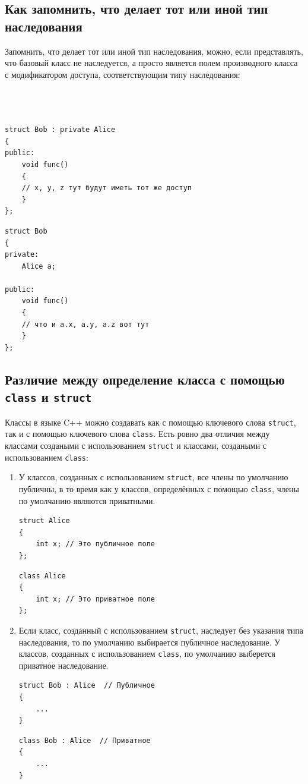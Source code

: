 \documentclass{article}
\begin{document}
\newpage
\subsection*{Как запомнить, что делает тот или иной тип наследования}
Запомнить, что делает тот или иной тип наследования, можно, если представлять, что базовый класс не наследуется, а просто является полем производного класса с модификатором доступа, соответствующим типу наследования:
\begin{multicols}{2}
\begin{lstlisting}



struct Bob : private Alice  
{
public:
	void func()
	{
	// x, y, z тут будут иметь тот же доступ
	}
};
\end{lstlisting}

\begin{lstlisting}
struct Bob
{
private:
	Alice a;

public:
	void func()
	{
	// что и a.x, a.y, a.z вот тут
	}
};
\end{lstlisting}
\end{multicols}
\subsection*{Различие между определение класса с помощью \texttt{class} и \texttt{struct}}
Классы в языке C++ можно создавать как с помощью ключевого слова \texttt{struct}, так и с помощью ключевого слова \texttt{class}. Есть ровно два отличия между классами создаными с использованием \texttt{struct} и классами, создаными с использованием \texttt{class}:
\begin{enumerate}
\item У классов, созданных с использованием \texttt{struct}, все члены по умолчанию публичны, в то время как у классов, определённых с помощью \texttt{class}, члены по умолчанию являются приватными.
\begin{multicols}{2}\noindent
\begin{lstlisting}
struct Alice
{
	int x; // Это публичное поле
};
\end{lstlisting}

\begin{lstlisting}
class Alice
{
	int x; // Это приватное поле
};
\end{lstlisting} 
\end{multicols}


\item Если класс, созданный с использованием \texttt{struct}, наследует без указания типа наследования, то по умолчанию выбирается публичное наследование. У классов, созданных с использованием \texttt{class}, по умолчанию выберется приватное наследование.
\begin{multicols}{2}\noindent
\begin{lstlisting}
struct Bob : Alice  // Публичное
{
	...
}
\end{lstlisting}

\begin{lstlisting}
class Bob : Alice  // Приватное
{
	...
}
\end{lstlisting} 
\end{multicols}
\end{enumerate}
\end{document}
